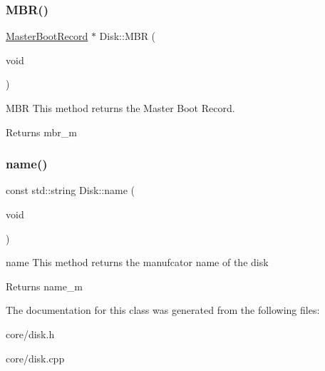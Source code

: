 \subsubsection{\texorpdfstring{M\+B\+R()}{MBR()}}
{\footnotesize\ttfamily \mbox{\hyperlink{classdisk_1_1_master_boot_record}{Master\+Boot\+Record}} $\ast$ Disk\+::\+M\+BR (\begin{DoxyParamCaption}\item[{void}]{ }\end{DoxyParamCaption})}



M\+BR This method returns the Master Boot Record. 

\begin{DoxyReturn}{Returns}
mbr\+\_\+m 
\end{DoxyReturn}
\mbox{\label{classdisk_1_1_disk_a889c305501805431f1189f179d8281ca}} 
\subsubsection{\texorpdfstring{name()}{name()}}
{\footnotesize\ttfamily const std\+::string Disk\+::name (\begin{DoxyParamCaption}\item[{void}]{ }\end{DoxyParamCaption})}



name This method returns the manufcator name of the disk 

\begin{DoxyReturn}{Returns}
name\+\_\+m 
\end{DoxyReturn}


The documentation for this class was generated from the following files\+:\begin{DoxyCompactItemize}
\item 
core/disk.\+h\item 
core/disk.\+cpp\end{DoxyCompactItemize}

